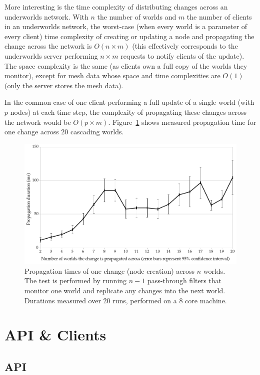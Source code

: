 \documentclass[letterpaper, 10pt, conference]{ieeeconf}
\newcommand{\uwds}{{\sc underworlds}\xspace}
\begin{document}
More interesting is the time complexity of distributing changes across an \uwds
network. With $n$ the number of worlds and $m$ the number of clients in an \uwds
network, the worst-case (when every world is a parameter of every
client) time complexity of creating or updating a node and propagating the
change across the network is $O(n \times m)$ (this effectively corresponds to
the \uwds server performing $n \times m$ requests to notify clients of the
update).  The space complexity is the same (as clients own a full copy of the
worlds they monitor), except for mesh data whose space and time complexities are
$O(1)$ (only the server stores the mesh data).

In the common case of one client performing a full update of a single world
(with $p$ nodes) at each time step, the complexity of propagating these changes across
the network would be $O(p \times m)$. Figure~\ref{fig|performances} shows
measured propagation time for one change across 20 cascading worlds.

\begin{figure}
    \centering
    \includegraphics[width=\linewidth]{performances}
    \caption{Propagation times of one change (node creation)
    across $n$ worlds. The test is performed by running $n-1$ pass-through
    filters that monitor one world and replicate
    any changes into the next world. Durations measured over 20 runs, performed on
    a 8 core machine.}
    \label{fig|performances}
\end{figure}

\section{API \& Clients}
\label{apiclients}

\subsection{API}
\label{api}
\end{document}
